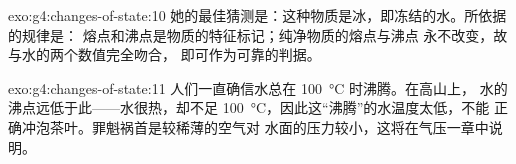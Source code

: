 \begin{solution}{exo:g4:changes-of-state:10}
她的最佳猜测是：这种物质是冰，即冻结的水。所依据的规律是：
熔点和沸点是物质的特征标记；纯净物质的熔点与沸点
永不改变，故与水的两个数值完全吻合，
即可作为可靠的判据。
\end{solution}

\begin{solution}{exo:g4:changes-of-state:11}
人们一直确信水总在 \qty{100}{\celsius} 时沸腾。在高山上，
水的沸点远低于此——水很热，却不足
\qty{100}{\celsius}，因此这“沸腾”的水温度太低，不能
正确冲泡茶叶。罪魁祸首是较稀薄的空气对
水面的压力较小，这将在气压一章中说明。
\end{solution}
